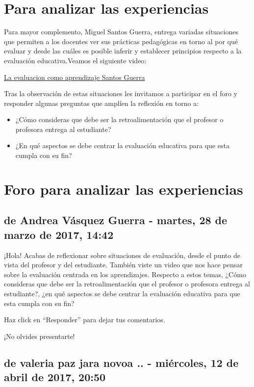 \documentclass[12pt,letterpaper,article,x11names]{memoir}
\begin{document}
\section{Para analizar las experiencias}
\label{sec:orgefc78c2}
Para mayor complemento, Miguel Santos Guerra, entrega variadas situaciones que permiten a los docentes ver sus prácticas pedagógicas en torno al por qué evaluar y desde las cuáles es posible inferir y establecer principios respecto a la evaluación educativa.Veamos el siguiente video:

\href{https://youtu.be/zhbM8dzpIYA}{La evaluacion como aprendizaje Santos Guerra}

Tras la observación de estas situaciones les invitamos a participar en el foro y responder algunas preguntas que amplíen la reflexión en torno a:
\begin{itemize}
\item ¿Cómo consideras que debe ser la retroalimentación que el profesor o profesora entrega al estudiante?
\item ¿En qué aspectos se debe centrar la evaluación educativa para que esta cumpla con su fin?
\end{itemize}

\section{Foro para analizar las experiencias}
\label{sec:org670c75a}
\subsection{de Andrea Vásquez Guerra - martes, 28 de marzo de 2017, 14:42}
\label{sec:orgc80d2ed}

¡Hola! 
Acabas de reflexionar sobre situaciones de evaluación, desde el punto de vista del profesor y del estudiante. También viste un video que nos hace pensar sobre la evaluación centrada en los aprendizajes. Respecto a estos temas, ¿Cómo consideras que debe ser la retroalimentación que el profesor o profesora entrega al estudiante?, ¿en qué aspectos se debe centrar la evaluación educativa para que esta cumpla con su fin? 

Haz click en “Responder” para dejar tus comentarios. 

¡No olvides presentarte!

\subsection{de valeria paz jara novoa .. - miércoles, 12 de abril de 2017, 20:50}
\label{sec:org38ea603}
\end{document}
